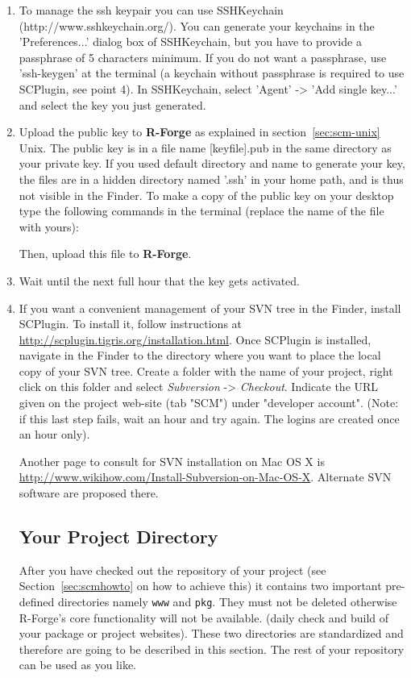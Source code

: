 \documentclass[a4paper]{article}
\begin{document}
\begin{enumerate}
\item To manage the ssh keypair you can use SSHKeychain
(http://www.sshkeychain.org/). You can generate your keychains in the
'Preferences...' dialog box of SSHKeychain, but you have to provide a
passphrase of 5 characters minimum. If you do not want a passphrase,
use 'ssh-keygen' at the terminal (a keychain without passphrase is
required to use SCPlugin, see point 4). In SSHKeychain, select 'Agent'
-> 'Add single key...' and select the key you just generated. 

\item Upload the public key to \textbf{R-Forge} as explained in
  section~\ref{sec:scm-unix}
  Unix. The public key is in a file name [keyfile].pub in the same
  directory as your private key. If you used default directory and
  name to generate your key, the files are in a hidden directory named
  '.ssh' in your home path, and is thus not visible in the Finder. To
  make a copy of the public key on your desktop type the following
  commands in the terminal (replace the name of the file with yours): 

  
  Then, upload this file to \textbf{R-Forge}.

\item Wait until the next full hour that the key gets activated.

\item If you want a convenient management of your SVN tree in the
  Finder, install SCPlugin. To install it, follow instructions at
  \url{http://scplugin.tigris.org/installation.html}. Once SCPlugin is
  installed, navigate in the Finder to the directory where you want to
  place the local copy of your SVN tree. Create a folder with the name
  of your project, right click on this folder and select \textit{Subversion}
  -> \textit{Checkout}. Indicate the URL given on the project web-site (tab
  "SCM") under "developer account". (Note: if this last step fails,
  wait an hour and try again. The logins are created once an hour
  only). 

Another page to consult for SVN installation on Mac OS X is
\url{http://www.wikihow.com/Install-Subversion-on-Mac-OS-X}. Alternate SVN
software are proposed there. 

\subsection{Your Project Directory}
After you have checked out the repository of your project (see
Section~\ref{sec:scmhowto} on how to achieve this) it contains two
important pre-defined directories namely 
\texttt{www} and \texttt{pkg}. They must not be
deleted otherwise R-Forge's core functionality will not be available.
(daily check and build of your package or project websites).
These two
directories are standardized and therefore are going to be described
in this section. The rest of your repository can be used as you like.


\end{enumerate}
\end{document}
